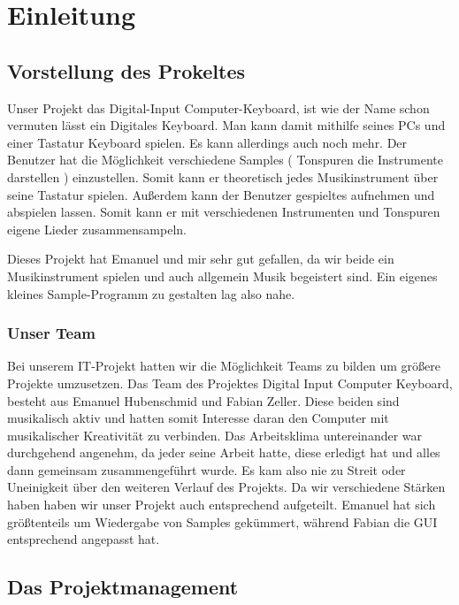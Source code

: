 \section{Einleitung}

\subsection{Vorstellung des Prokeltes}

Unser Projekt das Digital-Input Computer-Keyboard, ist wie der Name schon vermuten lässt ein 
Digitales Keyboard. Man kann damit mithilfe seines PCs und einer Tastatur Keyboard spielen. Es kann 
allerdings auch noch mehr. Der Benutzer hat die Möglichkeit verschiedene Samples ( Tonspuren die 
Instrumente darstellen ) einzustellen. Somit kann er theoretisch jedes Musikinstrument über seine 
Tastatur spielen. Außerdem kann der Benutzer gespieltes aufnehmen und abspielen lassen. Somit kann 
er mit verschiedenen Instrumenten und Tonspuren eigene Lieder zusammensampeln. 

Dieses Projekt hat Emanuel und mir sehr gut gefallen, da wir beide ein Musikinstrument spielen und 
auch allgemein Musik begeistert sind. Ein eigenes kleines Sample-Programm zu gestalten lag also 
nahe. \\



\subsubsection{Unser Team}

Bei unserem IT-Projekt hatten wir die Möglichkeit Teams zu bilden um größere Projekte umzusetzen. Das Team des Projektes Digital Input Computer Keyboard, besteht aus Emanuel Hubenschmid und Fabian Zeller. Diese beiden sind musikalisch aktiv und hatten somit Interesse daran den Computer mit musikalischer Kreativität zu verbinden. 
Das Arbeitsklima untereinander war durchgehend angenehm, da jeder seine Arbeit hatte, diese erledigt hat und alles dann gemeinsam zusammengeführt wurde. Es kam also nie zu Streit oder Uneinigkeit über den weiteren Verlauf des Projekts. Da wir verschiedene Stärken haben haben wir unser Projekt auch entsprechend aufgeteilt. Emanuel hat sich größtenteils um Wiedergabe von Samples gekümmert, während Fabian die GUI entsprechend angepasst hat.

\newpage


\subsection{Das Projektmanagement}
